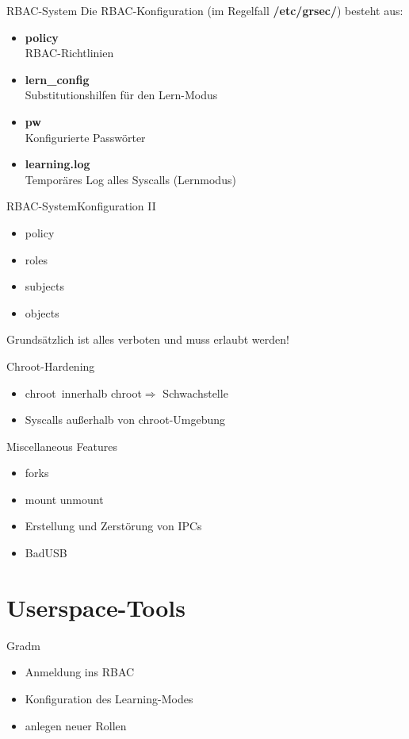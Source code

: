 \begin{frame}{RBAC-System}
	Die RBAC-Konfiguration (im Regelfall \textbf{/etc/grsec/}) besteht aus:
	\begin{itemize}
		\item \textbf{policy}\\ RBAC-Richtlinien
		\item \textbf{lern\_config}\\ Substitutionshilfen für den Lern-Modus
		\item \textbf{pw}\\ Konfigurierte Passwörter
		\item \textbf{learning.log}\\ Temporäres Log alles Syscalls (Lernmodus)
	\end{itemize}
\end{frame}

\begin{frame}{RBAC-System}{Konfiguration II}
	
	\begin{itemize}
		\item policy
		\item roles
		\item subjects
		\item objects
	\end{itemize}
	Grundsätzlich ist alles verboten und muss erlaubt werden!
\end{frame}

\begin{frame}{Chroot-Hardening}
	\begin{itemize}
		\item \glqq chroot\grqq~innerhalb \glqq chroot\grqq $\Rightarrow$ Schwachstelle
		\item Syscalls außerhalb von \glqq chroot\grqq -Umgebung
	\end{itemize}
\end{frame}

\begin{frame}{Miscellaneous Features}
	\begin{itemize}
		\item forks
		\item mount unmount
		\item Erstellung und Zerstörung von IPCs
		\item BadUSB
	\end{itemize}
\end{frame}

\section{Userspace-Tools}
\begin{frame}{Gradm}
	\begin{itemize}
		\item Anmeldung ins RBAC
		\item Konfiguration des Learning-Modes
		\item anlegen neuer Rollen
	\end{itemize}
\end{frame}

